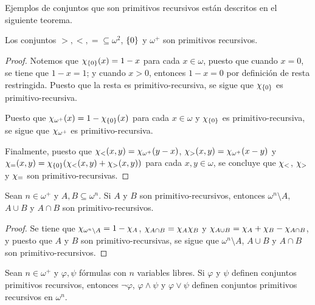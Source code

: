 Ejemplos de conjuntos que son primitivos recursivos están descritos en el siguiente teorema.

\begin{theorem}
	Los conjuntos $>, <, =\subseteq\omega^{2}$, $\{0\}$ y $\omega^{+}$ son primitivos recursivos.
\end{theorem}

\begin{proof}
	Notemos que $\CARACTERISTICA{\set{0}}\pa*{x} = 1 - x$ para cada $x\in\omega$, puesto que cuando $x = 0$, se tiene que $1 - x = 1$; y cuando $x > 0$, entonces $1 - x = 0$ por definición de resta restringida. Puesto que la resta es primitivo-recursiva, se sigue que $\chi_{\{0\}}$ es primitivo-recursiva.

	Puesto que $\CARACTERISTICA{\omega^{+}}\pa*{x} = 1 -\CARACTERISTICA{\set{0}}\pa*{x}$ para cada $x\in\omega$ y $\chi_{\{0\}}$ es primitivo-recursiva, se sigue que $\chi_{\omega^{+}}$ es primitivo-recursiva.

	Finalmente, puesto que $\chi_{ < }\pa*{x, y} =\CARACTERISTICA{\omega^{+}}\pa*{y - x}$, $\CARACTERISTICA{>}\pa*{x, y} =\CARACTERISTICA{\omega^{+}}\pa*{x - y}$ y $\CARACTERISTICA{=}\pa*{x, y} =\CARACTERISTICA{\set{0}}\pa*{\CARACTERISTICA{<}\pa*{x, y} +\CARACTERISTICA{>}\pa*{x, y}}$ para cada $x, y\in\omega$, se concluye que $\chi_{<}$, $\chi_{>}$ y $\chi_{=}$ son primitivo-recursivas.
\end{proof}

\begin{theorem}
	Sean $n\in\omega^{+}$ y $A, B\subseteq\omega^{n}$. Si $A$ y $B$ son primitivo-recursivos, entonces $\omega^{n}\setminus A$, $A\cup B$ y $A\cap B$ son primitivo-recursivos.
\end{theorem}

\begin{proof}
	Se tiene que $\chi_{\omega^{n}\setminus A} = 1 -\chi_{A}$, $\chi_{A\cap B} =\chi_{A}\chi_{B}$ y $\chi_{A\cup B} =\chi_{A} +\chi_{B} -\chi_{A\cap B}$, y puesto que $A$ y $B$ son primitivo-recursivas, se sigue que $\omega^{n}\setminus A$, $A\cup B$ y $A\cap B$ son primitivo-recursivos.
\end{proof}

\begin{coll}
	\label{coll: prim_rec_formulas}
	Sean $n\in\omega^{+}$ y $\varphi,\psi$ fórmulas con $n$ variables libres. Si $\varphi$ y $\psi$ definen conjuntos primitivos recursivos, entonces $\neg\varphi$, $\varphi\land\psi$ y $\varphi\vee\psi$ definen conjuntos primitivos recursivos en $\omega^{n}$.
\end{coll}

